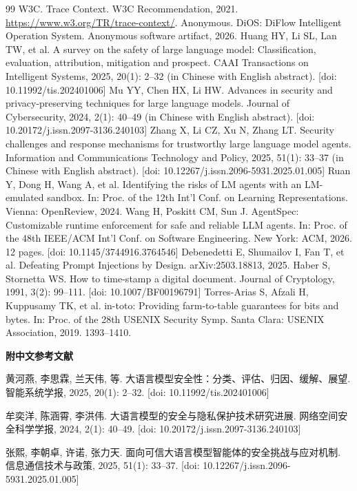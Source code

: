 {\begin{thebibliography}{99}
 W3C. Trace Context. W3C Recommendation, 2021. \url{https://www.w3.org/TR/trace-context/}.
 Anonymous. DiOS: DiFlow Intelligent Operation System. Anonymous software artifact, 2026.
 Huang HY, Li SL, Lan TW, et al. A survey on the safety of large language model: Classification, evaluation, attribution, mitigation and prospect. CAAI Transactions on Intelligent Systems, 2025, 20(1): 2--32 (in Chinese with English abstract). [doi: 10.11992/tis.202401006]
 Mu YY, Chen HX, Li HW. Advances in security and privacy-preserving techniques for large language models. Journal of Cybersecurity, 2024, 2(1): 40--49 (in Chinese with English abstract). [doi: 10.20172/j.issn.2097-3136.240103]
 Zhang X, Li CZ, Xu N, Zhang LT. Security challenges and response mechanisms for trustworthy large language model agents. Information and Communications Technology and Policy, 2025, 51(1): 33--37 (in Chinese with English abstract). [doi: 10.12267/j.issn.2096-5931.2025.01.005]
 Ruan Y, Dong H, Wang A, et al. Identifying the risks of LM agents with an LM-emulated sandbox. In: Proc. of the 12th Int'l Conf. on Learning Representations. Vienna: OpenReview, 2024.
 Wang H, Poskitt CM, Sun J. AgentSpec: Customizable runtime enforcement for safe and reliable LLM agents. In: Proc. of the 48th IEEE/ACM Int'l Conf. on Software Engineering. New York: ACM, 2026. 12 pages. [doi: 10.1145/3744916.3764546]
 Debenedetti E, Shumailov I, Fan T, et al. Defeating Prompt Injections by Design. arXiv:2503.18813, 2025.
 Haber S, Stornetta WS. How to time-stamp a digital document. Journal of Cryptology, 1991, 3(2): 99--111. [doi: 10.1007/BF00196791]
 Torres-Arias S, Afzali H, Kuppusamy TK, et al. in-toto: Providing farm-to-table guarantees for bits and bytes. In: Proc. of the 28th USENIX Security Symp. Santa Clara: USENIX Association, 2019. 1393--1410.
\end{thebibliography}

\vspace{1mm}
\noindent\textbf{附中文参考文献}

\noindent [12] 黄河燕, 李思霖, 兰天伟, 等. 大语言模型安全性：分类、评估、归因、缓解、展望. 智能系统学报, 2025, 20(1): 2--32. [doi: 10.11992/tis.202401006]

\noindent [13] 牟奕洋, 陈涵霄, 李洪伟. 大语言模型的安全与隐私保护技术研究进展. 网络空间安全科学学报, 2024, 2(1): 40--49. [doi: 10.20172/j.issn.2097-3136.240103]

\noindent [14] 张熙, 李朝卓, 许诺, 张力天. 面向可信大语言模型智能体的安全挑战与应对机制. 信息通信技术与政策, 2025, 51(1): 33--37. [doi: 10.12267/j.issn.2096-5931.2025.01.005]
}
